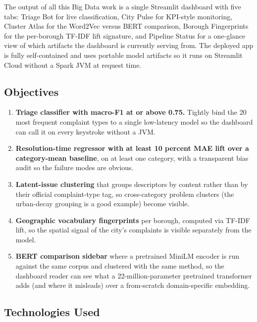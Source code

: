 \documentclass[11pt,letterpaper]{article}
\begin{document}
The output of all this Big Data work is a single Streamlit dashboard with five tabs: Triage Bot for live classification, City Pulse for KPI-style monitoring, Cluster Atlas for the Word2Vec versus BERT comparison, Borough Fingerprints for the per-borough TF-IDF lift signature, and Pipeline Status for a one-glance view of which artifacts the dashboard is currently serving from. The deployed app is fully self-contained and uses portable model artifacts so it runs on Streamlit Cloud without a Spark JVM at request time.

\subsection{Objectives}

\begin{enumerate}
  \item \textbf{Triage classifier with macro-F1 at or above 0.75.} Tightly bind the 20 most frequent complaint types to a single low-latency model so the dashboard can call it on every keystroke without a JVM.
  \item \textbf{Resolution-time regressor with at least 10 percent MAE lift over a category-mean baseline}, on at least one category, with a transparent bias audit so the failure modes are obvious.
  \item \textbf{Latent-issue clustering} that groups descriptors by content rather than by their official complaint-type tag, so cross-category problem clusters (the urban-decay grouping is a good example) become visible.
  \item \textbf{Geographic vocabulary fingerprints} per borough, computed via TF-IDF lift, so the spatial signal of the city's complaints is visible separately from the model.
  \item \textbf{BERT comparison sidebar} where a pretrained MiniLM encoder is run against the same corpus and clustered with the same method, so the dashboard reader can see what a 22-million-parameter pretrained transformer adds (and where it misleads) over a from-scratch domain-specific embedding.
\end{enumerate}

\subsection{Technologies Used}
\end{document}
